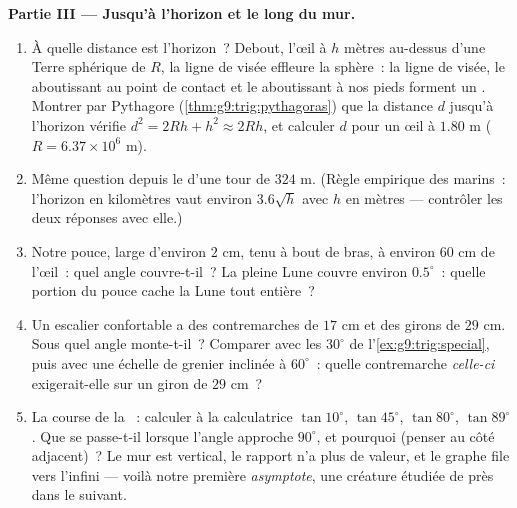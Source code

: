 \begin{problem}
\medskip
\noindent\textbf{Partie III --- Jusqu'à l'horizon et le long du
mur.}
\begin{enumerate}[resume]
  \item À quelle distance est l'horizon~? Debout, l'œil à $h$ mètres
        au-dessus d'une Terre sphérique de  $R$, la ligne de
        visée effleure la sphère~: la ligne de visée, le 
        aboutissant au point de contact et le  aboutissant à
        nos pieds forment un . Montrer par
        Pythagore (\cref{thm:g9:trig:pythagoras}) que la distance
        $d$ jusqu'à l'horizon vérifie $d^2 = 2Rh + h^2 \approx 2Rh$,
        et calculer $d$ pour un œil à $1.80$ m
        ($R = 6.37 \times 10^6$ m).
  \item Même question depuis le  d'une tour de $324$ m.
        (Règle empirique des marins~: l'horizon en kilomètres vaut
        environ $3.6\sqrt{h}$ avec $h$ en mètres --- contrôler les
        deux réponses avec elle.)
  \item Notre pouce, large d'environ $2$ cm, tenu à bout de bras, à
        environ $60$ cm de l'œil~: quel angle couvre-t-il~? La
        pleine Lune couvre environ $0.5^\circ$~: quelle portion du
        pouce cache la Lune tout entière~?
  \item Un escalier confortable a des contremarches de $17$ cm et
        des girons de $29$ cm. Sous quel angle monte-t-il~? Comparer
        avec les $30^\circ$ de l'\cref{ex:g9:trig:special}, puis avec
        une échelle de grenier inclinée à $60^\circ$~: quelle
        contremarche \emph{celle-ci} exigerait-elle sur un giron de
        $29$ cm~?
  \item La course de la ~: calculer à la calculatrice
        $\tan 10^\circ$, $\tan 45^\circ$, $\tan 80^\circ$,
        $\tan 89^\circ$. Que se passe-t-il lorsque l'angle approche
        $90^\circ$, et pourquoi (penser au côté adjacent)~? Le mur
        est vertical, le rapport n'a plus de valeur, et le graphe
        file vers l'infini --- voilà notre première
        \emph{asymptote}, une créature étudiée de près dans le
         suivant.
\end{enumerate}
\end{problem}
